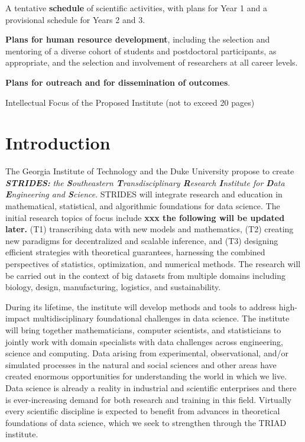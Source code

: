 \documentclass[12pt]{article}
\begin{document}
A tentative {\bf schedule} of scientific activities, with plans for Year 1 and a provisional schedule for Years 2 and 3.

{\bf Plans for human resource development}, including the selection and mentoring of a diverse cohort of students and postdoctoral participants, as appropriate, and the selection and involvement of researchers at all career levels.

{\bf Plans for outreach and for dissemination of outcomes}.

\clearpage

\setcounter{page}{1}

\begin{center}
Intellectual Focus of the Proposed Institute (not to exceed 20 pages)
\end{center}

\section{Introduction}
The Georgia Institute of Technology and the Duke University propose to create {\it \bf STRIDES:} {\it the {\bf S}outheastern {\bf T}ransdisciplinary {\bf R}esearch {\bf I}nstitute for {\bf D}ata {\bf E}ngineering and {\bf S}cience}.
STRIDES will integrate research and education in mathematical, statistical, and algorithmic foundations for data science.
The initial research topics of focus include {\bf xxx the following will be updated later.}
(T1) transcribing data with new models and mathematics,
(T2) creating new paradigms for decentralized and scalable inference,
and (T3) designing efficient strategies with theoretical guarantees, harnessing the combined
perspectives of statistics, optimization, and numerical methods.
The research will be carried out in the context of big datasets from multiple domains
including biology, design, manufacturing, logistics, and sustainability.

During its lifetime, the institute will develop methods and tools to address
high-impact multidisciplinary foundational challenges in data science.  The institute
will bring together mathematicians, computer scientists, and statisticians to jointly
work with domain specialists with data challenges across engineering, science and computing.
Data arising from experimental, observational, and/or simulated processes in the natural and
social sciences and other areas have created enormous opportunities for understanding the
world in which we live. Data science is already a reality in industrial and scientific
enterprises and there is ever-increasing demand for both research and training in this field.
Virtually every scientific discipline is expected to benefit from advances in theoretical
foundations of data science, which we seek to strengthen through the TRIAD institute.
\end{document}

